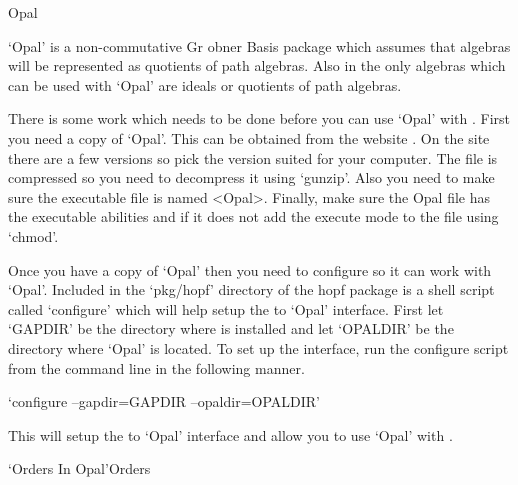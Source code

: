 %
%
%



\>Opal

`Opal' is a non-commutative Gr obner Basis package which assumes that 
algebras will be represented as quotients of path algebras.  Also in 
{\QPA} the only algebras which can be used with `Opal' are ideals or 
quotients of path algebras.  

There is some work which needs to be done before you can use `Opal' 
with {\GAP}.  First you need a copy of `Opal'.  This can be obtained from 
the website .  On the site 
there are a few versions so pick the version suited for your 
computer.  The file is compressed so you need to decompress it using 
`gunzip'.  Also you need to make sure the executable file is named 
<Opal>.  Finally, make sure the Opal file has the executable 
abilities and if it does not add the execute mode to the file using 
`chmod'.

Once you have a copy of `Opal' then you need to configure {\GAP} so it can 
work with `Opal'.  Included in the `pkg/hopf' directory of the hopf package is a shell script 
called `configure' which will help setup the {\GAP} to `Opal' interface.  
First let `GAPDIR' be the directory where {\GAP} is installed and let 
`OPALDIR' be the directory where `Opal' is located.
 To set up the interface,
run the configure script
from the command line 
in the following manner.

`configure --gapdir=GAPDIR  --opaldir=OPALDIR'

This will setup the {\GAP} to `Opal' interface and allow you to use `Opal' 
with {\GAP.}


\>`Orders In Opal'{Orders}

